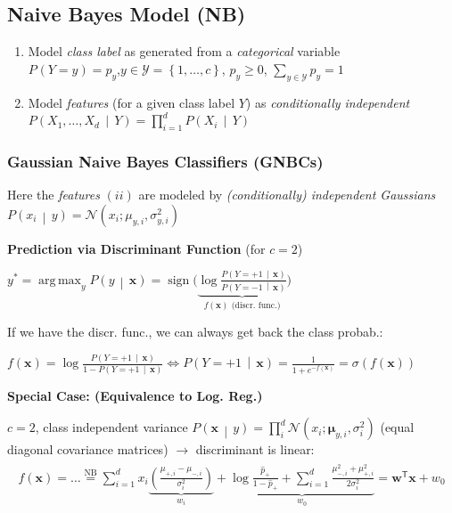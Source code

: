 \documentclass[a4paper,8pt,landscape]{extarticle}
\newcommand{\cN}{\mathcal{N}}
\newcommand{\cY}{\mathcal{Y}}
\newcommand{\set}[1]{\left\{ #1 \right\}}
\newcommand{\Prob}[2][]{P_{#1}\left( #2 \right)}
\newcommand{\cProb}[2]{P\left( #1 \,\middle|\, #2 \right)}
\newcommand*{\T}{\mathsf{T}}
\DeclareMathOperator{\sign}{sign}
\DeclareMathOperator*{\argmax}{arg\,max}
\renewcommand{\vec}[1]{\mathbf{#1}}
\newcommand{\vw}{\vec{w}}
\newcommand{\vx}{\vec{x}}
\newcommand{\vmu}{\boldsymbol{\mu}}
\begin{document}
\begin{multicols*}{3}
\subsection{Naive Bayes Model (NB)}

\begin{enumerate}[label=(\roman*)]
  \item Model \emph{class label} as generated from a \emph{categorical}
  variable\\
  $\Prob{Y=y}=p_y$,\quad $y\in\cY=\set{1,\ldots,c}$, \quad $p_y\geq 0$, \quad
  $\sum_{y\in\cY}p_y=1$
  \item Model \emph{features} (for a given class label $Y$) as
  \emph{conditionally independent}
  $\cProb{X_1,\ldots,X_d}{Y} = \prod_{i=1}^d\cProb{X_i}{Y}$\\
\end{enumerate}

\subsubsection{Gaussian Naive Bayes Classifiers (GNBCs)}

Here the \emph{features} $(ii)$ are modeled by \emph{(conditionally) independent
Gaussians} $\cProb{x_i}{y}=\cN(x_i;\mu_{y,i},\sigma^2_{y,i})$

\textbf{Prediction via Discriminant Function} (for $c=2$)

$y^*=\argmax_y \cProb{y}{\vx}=\sign\Big(\underbrace{\log\frac{
  \cProb{Y=+1}{\vx}}{\cProb{Y=-1}{\vx}
  }}_{f(\vx) \text{ (discr. func.)}}\Big)$

 If we have the discr. func., we can always get back the class probab.:

$f(\vx)=\log\frac{\cProb{Y=+1}{\vx}}{1-\cProb{Y=+1}{\vx}} \Longleftrightarrow 
\cProb{Y=+1}{\vx}=\frac{1}{1+e^{-f(\vx)}}=\sigma(f(\vx))$

\textbf{Special Case: (Equivalence to Log. Reg.)}

$c=2$, class independent variance
$\cProb{\vx}{y}=\prod_{i}^d \cN(x_i;\vmu_{y,i},\sigma_i^2)$ (equal diagonal
covariance matrices) $\to$ discriminant is linear:
\begin{gather*}
\begin{align*}
f(\vx)=\ldots
\stackrel{\text{NB}}{=}\sum_{i=1}^d x_i \underbrace{\left(\frac{
\mu_{+,i}-\mu_{-,i}}{\sigma_i^2
}\right)}_{w_i}
+\underbrace{\log\frac{\hat{p}_+}{1-\hat{p}_+}+\sum_{i=1}^d\frac{\mu_{-,i}^2+\mu_{+,i}^2}{2\sigma_i^2}}_{w_0}
=\vw^\T\vx+w_0
\end{align*}
\end{gather*}


\end{multicols*}
\end{document}
